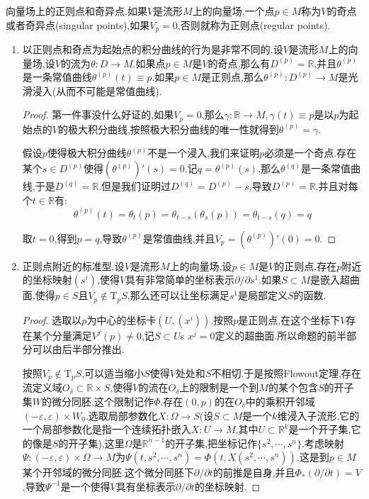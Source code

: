 向量场上的正则点和奇异点.如果$V$是流形$M$上的向量场,一个点$p\in M$称为$V$的奇点或者奇异点(singular points),如果$V_p=0$,否则就称为正则点(regular points).
\begin{enumerate}
	\item 以正则点和奇点为起始点的积分曲线的行为是非常不同的.设$V$是流形$M$上的向量场,设$V$的流为$\theta:D\to M$.如果点$p\in M$是$V$的奇点,那么有$D^{(p)}=\mathbb{R}$,并且$\theta^{(p)}$是一条常值曲线$\theta^{(p)}(t)\equiv p$.如果$p\in M$是正则点,那么$\theta^{(p)}:D^{(p)}\to M$是光滑浸入(从而不可能是常值曲线).
	\begin{proof}
		
		第一件事没什么好证的,如果$V_p=0$,那么$\gamma:\mathbb{R}\to M,\gamma(t)\equiv p$是以$p$为起始点的$V$的极大积分曲线,按照极大积分曲线的唯一性就得到$\theta^{(p)}=\gamma$.
		
		假设$p$使得极大积分曲线$\theta^{(p)}$不是一个浸入,我们来证明$p$必须是一个奇点.存在某个$s\in D^{(p)}$使得$(\theta^{(p)})'(s)=0$.记$q=\theta^{(p)}(s)$,那么$\theta^{(q)}$是一条常值曲线,于是$D^{(q)}=\mathbb{R}$.但是我们证明过$D^{(q)}=D^{(p)}-s$,导致$D^{(p)}=\mathbb{R}$.并且对每个$t\in\mathbb{R}$有:
		$$\theta^{(p)}(t)=\theta_t(p)=\theta_{t-s}(\theta_s(p))=\theta_{t-s}(q)=q$$
		
		取$t=0$,得到$p=q$,导致$\theta^{(p)}$是常值曲线,并且$V_p=(\theta^{(p)})'(0)=0$.
	\end{proof}
	\item 正则点附近的标准型.设$V$是流形$M$上的向量场,设$p\in M$是$V$的正则点.存在$p$附近的坐标映射$(s^i)$,使得$V$具有非常简单的坐标表示$\partial/\partial s^1$.如果$S\subset M$是嵌入超曲面,使得$p\in S$且$V_p\not\in\mathrm{T}_pS$,那么还可以让坐标满足$s^1$是局部定义$S$的函数.
	\begin{proof}
		
		选取以$p$为中心的坐标卡$(U,(x^i))$.按照$p$是正则点,在这个坐标下$V$存在某个分量满足$V^j(p)\not=0$,记$S\subset U$s $x^j=0$定义的超曲面.所以命题的前半部分可以由后半部分推出.
		
		按照$V_p\not\in\mathrm{T}_pS$,可以适当缩小$S$使得$V$处处和$S$不相切.于是按照Flowout定理,存在流定义域$O_{\delta}\subset\mathbb{R}\times S$,使得$V$的流在$O_{\delta}$上的限制是一个到$M$的某个包含$S$的开子集$W$的微分同胚,这个限制记作$\Phi$.存在$(0,p)的在$$O_{\delta}$中的乘积开邻域$(-\varepsilon,\varepsilon)\times W_0$.选取局部参数化$X:\Omega\to S$(设$S\subset M$是一个$k$维浸入子流形,它的一个局部参数化是指一个连续拓扑嵌入$X:U\to M$,其中$U\subset\mathbb{R}^k$是一个开子集,它的像是$S$的开子集),这里$\Omega$是$\mathbb{R}^{n-1}$的开子集,把坐标记作$\{s^2,\cdots,s^n\}$.考虑映射$\Psi:(-\varepsilon,\varepsilon)\times\Omega\to M$为$\Psi(t,s^2,\cdots,s^n)=\Phi(t,X(s^2,\cdots,s^n))$.这是到$p\in M$某个开邻域的微分同胚.这个微分同胚下$\partial/\partial t$的前推是自身,并且$\Phi_*(\partial/\partial t)=V$,导致$\Psi^{-1}$是一个使得$V$具有坐标表示$\partial/\partial t$的坐标映射.
	\end{proof}
\end{enumerate}


